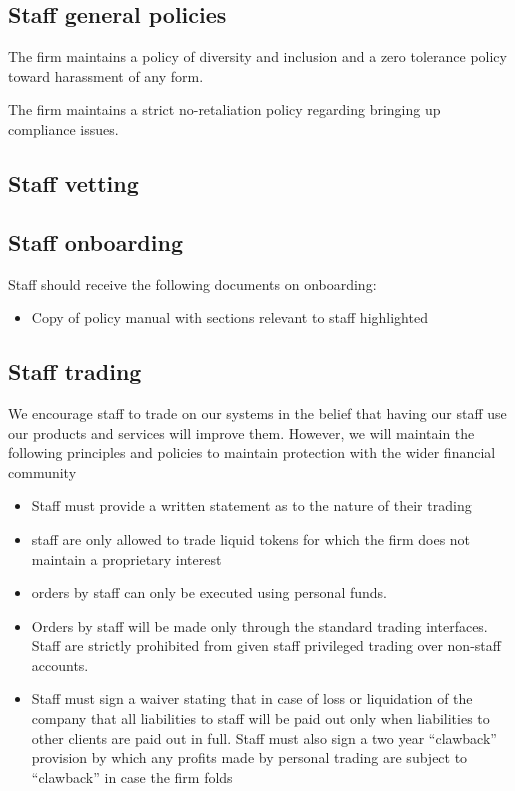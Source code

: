 \subsection{Staff general policies}

The firm maintains a policy of diversity and inclusion and a zero
tolerance policy toward harassment of any form.

The firm maintains a strict no-retaliation policy regarding bringing up
compliance issues.

\subsection{Staff vetting}

\subsection{Staff onboarding}

Staff should receive the following documents on onboarding:

\begin{itemize}
  \item Copy of policy manual with sections relevant to staff
    highlighted
\end{itemize}

\subsection{Staff trading}

We encourage staff to trade on our systems in the belief that having
our staff use our products and services will improve them.
However, we will maintain the following principles and policies to
maintain protection with the wider financial community

\begin{itemize}
 \item Staff must provide a written statement as to the nature of
   their trading
  \item staff are only allowed to trade liquid tokens for which the
    firm does not maintain a proprietary interest
  \item orders by staff can only be executed using personal funds.
  \item Orders by staff will be made only through the standard trading
    interfaces.  Staff are strictly prohibited from given staff
    privileged trading over non-staff accounts.
  \item Staff must sign a waiver stating that in case of loss or
    liquidation of the company that all liabilities to staff will be
    paid out only when liabilities to other clients are paid out in
    full.  Staff must also sign a two year ``clawback'' provision by
    which any profits made by personal trading are subject to
    ``clawback'' in case the firm folds
\end{itemize}

